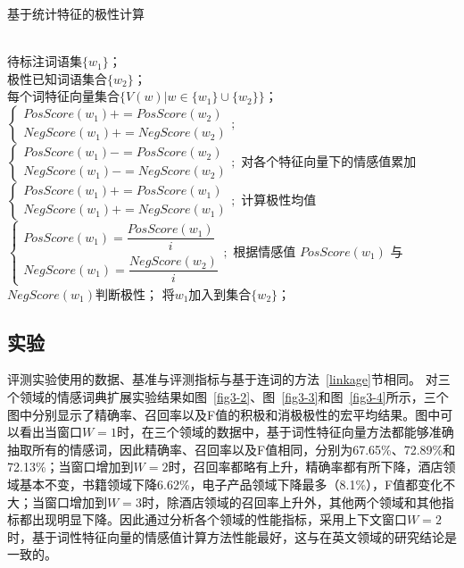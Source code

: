 \begin{algorithm}[htp]
\caption{基于统计特征的极性计算}
\label{alg3-2}
\begin{algorithmic}[1]
\REQUIRE ~~\\
待标注词语集$\{w_1\}$；\\
极性已知词语集合$\{w_2\}$；\\
每个词特征向量集合$\{V(w)|w \in \{w_1\}\cup \{w_2\} \}$；
\STATE $
\begin{cases}
PosScore(w_1)+=PosScore(w_2)\\
NegScore(w_1)+=NegScore(w_2)
\end{cases};$
\ELSE
\STATE $
\begin{cases}
PosScore(w_1)-=PosScore(w_2)\\
NegScore(w_1)-=NegScore(w_2)
\end{cases};$
\ENDIF
\ENDFOR
\STATE 对各个特征向量下的情感值累加
\STATE $
\begin{cases}
PosScore(w_1)+=PosScore(w_1)\\
NegScore(w_1)+=NegScore(w_1)
\end{cases};$
\ENDFOR
\STATE 计算极性均值$
\begin{cases}
PosScore(w_1)=\dfrac{PosScore(w_1)}{i}\\
NegScore(w_1)=\dfrac{NegScore(w_2)}{i}
\end{cases};$
\STATE 根据情感值 $PosScore(w_1)$ 与$ NegScore(w_1) $判断极性；
\STATE 将$ w_1 $加入到集合$ \{w_2\} $；
\ENDFOR
\end{algorithmic}
\end{algorithm}

\subsection{实验}
评测实验使用的数据、基准与评测指标与基于连词的方法~\ref{linkage}节相同。
对三个领域的情感词典扩展实验结果如图~\ref{fig3-2}、图~\ref{fig3-3}和图~\ref{fig3-4}所示，三个图中分别显示了精确率、召回率以及F值的积极和消极极性的宏平均结果。图中可以看出当窗口$W=1$时，在三个领域的数据中，基于词性特征向量方法都能够准确抽取所有的情感词，因此精确率、召回率以及F值相同，分别为67.65\%、72.89\%和72.13\%；当窗口增加到$W=2$时，召回率都略有上升，精确率都有所下降，酒店领域基本不变，书籍领域下降6.62\%，电子产品领域下降最多（8.1\%），F值都变化不大；当窗口增加到$W=3$时，除酒店领域的召回率上升外，其他两个领域和其他指标都出现明显下降。因此通过分析各个领域的性能指标，采用上下文窗口$W=2$时，基于词性特征向量的情感值计算方法性能最好，这与在英文领域的研究结论是一致的。

